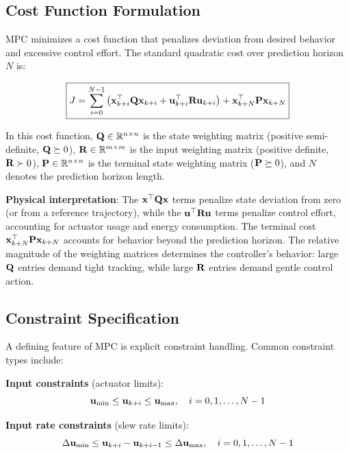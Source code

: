 \subsection{Cost Function Formulation}

MPC minimizes a cost function that penalizes deviation from desired behavior and excessive control effort. The standard quadratic cost over prediction horizon $N$ is:

\begin{equation}
\boxed{
    J = \sum_{i=0}^{N-1} \left( \mathbf{x}_{k+i}^\top \mathbf{Q} \mathbf{x}_{k+i} + \mathbf{u}_{k+i}^\top \mathbf{R} \mathbf{u}_{k+i} \right) + \mathbf{x}_{k+N}^\top \mathbf{P} \mathbf{x}_{k+N}
}
\label{eq:mpc_cost}
\end{equation}

In this cost function, $\mathbf{Q} \in \mathbb{R}^{n \times n}$ is the state weighting matrix (positive semi-definite, $\mathbf{Q} \succeq 0$), $\mathbf{R} \in \mathbb{R}^{m \times m}$ is the input weighting matrix (positive definite, $\mathbf{R} \succ 0$), $\mathbf{P} \in \mathbb{R}^{n \times n}$ is the terminal state weighting matrix ($\mathbf{P} \succeq 0$), and $N$ denotes the prediction horizon length.

\textbf{Physical interpretation}: The $\mathbf{x}^\top \mathbf{Q} \mathbf{x}$ terms penalize state deviation from zero (or from a reference trajectory), while the $\mathbf{u}^\top \mathbf{R} \mathbf{u}$ terms penalize control effort, accounting for actuator usage and energy consumption. The terminal cost $\mathbf{x}_{k+N}^\top \mathbf{P} \mathbf{x}_{k+N}$ accounts for behavior beyond the prediction horizon. The relative magnitude of the weighting matrices determines the controller's behavior: large $\mathbf{Q}$ entries demand tight tracking, while large $\mathbf{R}$ entries demand gentle control action.

\subsection{Constraint Specification}

A defining feature of MPC is explicit constraint handling. Common constraint types include:

\textbf{Input constraints} (actuator limits):
\begin{equation}
    \mathbf{u}_{\min} \leq \mathbf{u}_{k+i} \leq \mathbf{u}_{\max}, \quad i = 0, 1, \ldots, N-1
\label{eq:input_constraints}
\end{equation}

\textbf{Input rate constraints} (slew rate limits):
\begin{equation}
    \Delta\mathbf{u}_{\min} \leq \mathbf{u}_{k+i} - \mathbf{u}_{k+i-1} \leq \Delta\mathbf{u}_{\max}, \quad i = 0, 1, \ldots, N-1
\label{eq:rate_constraints}
\end{equation}

